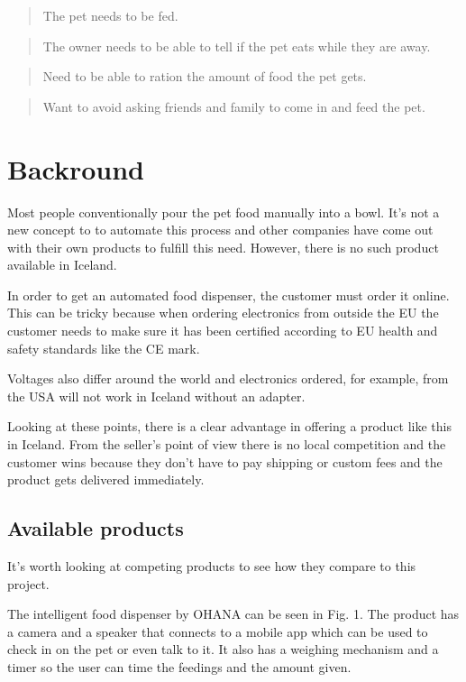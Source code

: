 \documentclass[twocolumn]{webofc}
\begin{document}
\begin{quote} \textbf{} The pet needs to be fed.
\end{quote}
\begin{quote} \textbf{} The owner needs to be able to tell if the pet eats while they are away.
\end{quote}
\begin{quote} \textbf{} Need to be able to ration the amount of food the pet gets.
\end{quote}
\begin{quote} \textbf{} Want to avoid asking friends and family to come in and feed the pet.
\end{quote}





\section{Backround}
Most people conventionally pour the pet food manually into a bowl.
It’s not a new concept to to automate this process and other companies have come out with their own products to fulfill this need.
However, there is no such product available in Iceland.

In order to get an automated food dispenser, the customer must order it online.
This can be tricky because when ordering electronics from outside the EU the customer needs to make sure it has been certified according to EU health and safety standards like the CE mark.\cite{CE}

Voltages also differ around the world and electronics ordered, for example, from the USA will not work in Iceland without an adapter.\cite{adapters}

Looking at these points, there is a clear advantage in offering a product like this in Iceland. From the seller's point of view there is no local competition and the customer wins because they don't have to pay shipping or custom fees and the product gets delivered immediately. 
\subsection{Available products}
It’s worth looking at competing products to see how they compare to this project.

The intelligent food dispenser by OHANA can be seen in Fig. 1.
The product has a camera and a speaker that connects to a mobile app which can be used to check in on the pet or even talk to it.
It also has a weighing mechanism and a timer so the user can time the feedings and the amount given.\cite{ohana}
\end{document}
